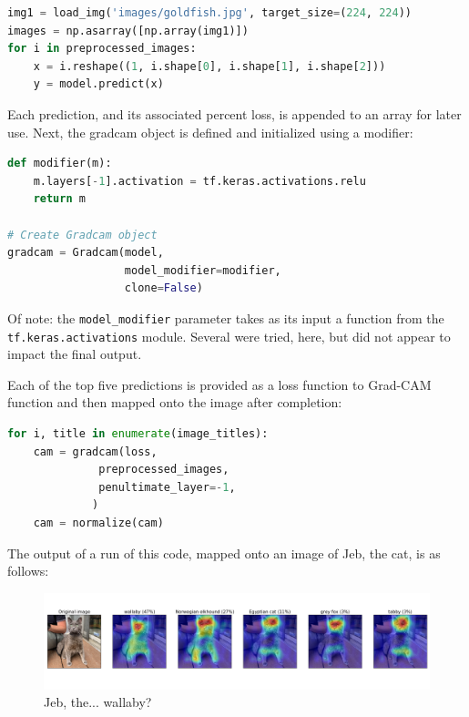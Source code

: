 \documentclass{article}
\begin{document}
\begin{lstlisting}[language=Python]
img1 = load_img('images/goldfish.jpg', target_size=(224, 224))
images = np.asarray([np.array(img1)])
for i in preprocessed_images:
    x = i.reshape((1, i.shape[0], i.shape[1], i.shape[2]))
    y = model.predict(x)
\end{lstlisting}

\par Each prediction, and its associated percent loss, is appended to an array for later use. Next, the gradcam object is defined and initialized using a modifier:

\begin{lstlisting}[language=Python]
def modifier(m):
    m.layers[-1].activation = tf.keras.activations.relu
    return m

# Create Gradcam object
gradcam = Gradcam(model,
                  model_modifier=modifier,
                  clone=False)
\end{lstlisting}

\par Of note: the \lstinline{model_modifier} parameter takes as its input a function from the \lstinline{tf.keras.activations} module.
Several were tried, here, but did not appear to impact the final output.

\par Each of the top five predictions is provided as a loss function to Grad-CAM function and then mapped onto the image after completion:

\begin{lstlisting}[language=Python]
for i, title in enumerate(image_titles):
    cam = gradcam(loss,
              preprocessed_images,
              penultimate_layer=-1,
             )
    cam = normalize(cam)
\end{lstlisting}

\par The output of a run of this code, mapped onto an image of Jeb, the cat, is as follows:
\begin{figure}[H]
    \centering
    \includegraphics[width=6in]{csci-8110/hw-2/images/jeb_output.png}
    \caption{Jeb, the... wallaby?}
    \label{fig:jeb}
\end{figure}
\end{document}
